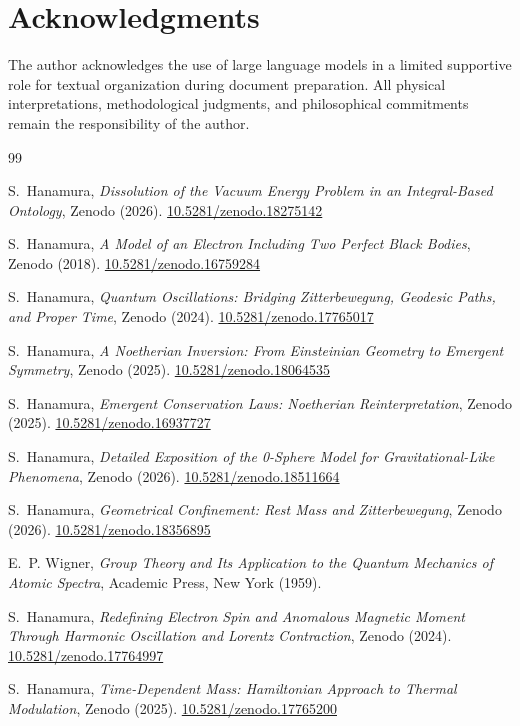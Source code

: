\documentclass[%
 reprint, amsmath,amssymb, aps, prb, ]{revtex4-2}
\numberwithin{equation}{section}
\begin{document}
\section*{Acknowledgments}

The author acknowledges the use of large language models in a limited supportive role for textual organization during document preparation. All physical interpretations, methodological judgments, and philosophical commitments remain the responsibility of the author.

\begin{thebibliography}{99}

S.~Hanamura, \textit{Dissolution of the Vacuum Energy Problem in an Integral-Based Ontology}, Zenodo (2026). \href{https://doi.org/10.5281/zenodo.18275142}{10.5281/zenodo.18275142}

S.~Hanamura, \textit{A Model of an Electron Including Two Perfect Black Bodies}, Zenodo (2018). \href{https://doi.org/10.5281/zenodo.16759284}{10.5281/zenodo.16759284}

S.~Hanamura, \textit{Quantum Oscillations: Bridging Zitterbewegung, Geodesic Paths, and Proper Time}, Zenodo (2024). \href{https://doi.org/10.5281/zenodo.17765017}{10.5281/zenodo.17765017}

S.~Hanamura, \textit{A Noetherian Inversion: From Einsteinian Geometry to Emergent Symmetry}, Zenodo (2025). \href{https://doi.org/10.5281/zenodo.18064535}{10.5281/zenodo.18064535}

S.~Hanamura, \textit{Emergent Conservation Laws: Noetherian Reinterpretation}, Zenodo (2025). \href{https://doi.org/10.5281/zenodo.16937727}{10.5281/zenodo.16937727}

S.~Hanamura, \textit{Detailed Exposition of the 0-Sphere Model for Gravitational-Like Phenomena}, Zenodo (2026). \href{https://doi.org/10.5281/zenodo.18511664}{10.5281/zenodo.18511664}

S.~Hanamura, \textit{Geometrical Confinement: Rest Mass and Zitterbewegung}, Zenodo (2026). \href{https://doi.org/10.5281/zenodo.18356895}{10.5281/zenodo.18356895}

E.~P. Wigner, \textit{Group Theory and Its Application to the Quantum Mechanics of Atomic Spectra}, Academic Press, New York (1959).

S.~Hanamura, \textit{Redefining Electron Spin and Anomalous Magnetic Moment Through Harmonic Oscillation and Lorentz Contraction}, Zenodo (2024). \href{https://doi.org/10.5281/zenodo.17764997}{10.5281/zenodo.17764997}

S.~Hanamura, \textit{Time-Dependent Mass: Hamiltonian Approach to Thermal Modulation}, Zenodo (2025). \href{https://doi.org/10.5281/zenodo.17765200}{10.5281/zenodo.17765200}

\end{thebibliography}
\end{document}
